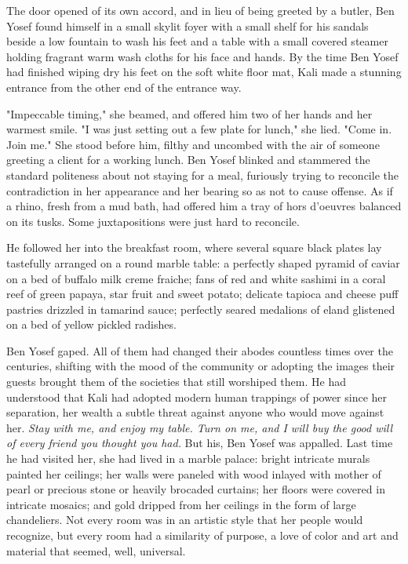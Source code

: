 \documentclass{amsart}
\begin{document}
The door opened of its own accord, and in lieu of being greeted by a butler, Ben Yosef found himself in a small skylit foyer with a small shelf for his sandals beside a low fountain to wash his feet and a table with a small covered steamer holding fragrant warm wash cloths for his face and hands. By the time Ben Yosef had finished wiping dry his feet on the soft white floor mat, Kali made a stunning entrance from the other end of the entrance way. 

"Impeccable timing," she beamed, and offered him two of her hands and her warmest smile. "I was just setting out a few plate for lunch," she lied. "Come in. Join me." She stood before him, filthy and uncombed with the air of someone greeting a client for a working lunch. Ben Yosef blinked and stammered the standard politeness about not staying for a meal, furiously trying to reconcile the contradiction in her appearance and her bearing so as not to cause offense. As if a rhino, fresh from a mud bath, had offered him a tray of hors d'oeuvres balanced on its tusks. Some juxtapositions were just hard to reconcile.

He followed her into the breakfast room, where several square black plates lay tastefully arranged on a round marble table: a perfectly shaped pyramid of caviar on a bed of buffalo milk creme fraiche; fans of red and white sashimi in a coral reef of green papaya, star fruit and sweet potato; delicate tapioca and cheese puff pastries drizzled in tamarind sauce; perfectly seared medalions of eland glistened on a bed of yellow pickled radishes. 

Ben Yosef gaped. All of them had changed their abodes countless times over the centuries, shifting with the mood of the community or adopting the images their guests brought them of the societies that still worshiped them. He had understood that Kali had adopted modern human trappings of power since her separation, her wealth a subtle threat against anyone who would move against her. \emph{Stay with me, and enjoy my table. Turn on me, and I will buy the good will of every friend you thought you had.} But his, Ben Yosef was appalled. Last time he had visited her, she had lived in a marble palace: bright intricate murals painted her ceilings; her walls were paneled with wood inlayed with mother of pearl or precious stone or heavily brocaded curtains; her floors were covered in intricate mosaics; and gold dripped from her ceilings in the form of large chandeliers. Not every room was in an artistic style that her people would recognize, but every room had a similarity of purpose, a love of color and art and material that seemed, well, universal. 
\end{document}
